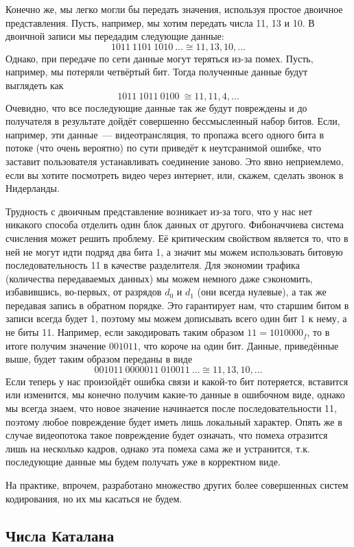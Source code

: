 Конечно же, мы легко могли бы передать значения, используя простое двоичное представления. Пусть, например, мы хотим передать числа 11, 13 и 10. В двоичной записи мы передадим следующие данные:
$$1011\ 1101\ 1010\ \ldots \cong 11,13,10,\ldots$$
Однако, при передаче по сети данные могут теряться из-за помех. Пусть, например, мы потеряли четвёртый бит. Тогда полученные данные будут выглядеть как
$$1011\ 1011\ 0100\ \cong 11, 11, 4, \ldots$$
Очевидно, что все последующие данные так же будут повреждены и до получателя в результате дойдёт совершенно бессмысленный набор битов. Если, например, эти данные~— видеотрансляция, то пропажа всего одного бита в потоке (что очень вероятно) по сути приведёт к неутсранимой ошибке, что заставит пользователя устанавливать соединение заново. Это явно неприемлемо, если вы хотите посмотреть видео через интернет, или, скажем, сделать звонок в Нидерланды.

Трудность с двоичным представление возникает из-за того, что у нас нет никакого способа отделить один блок данных от другого. Фибоначчиева система счисления может решить проблему. Её критическим свойством является то, что в ней не могут идти подряд два бита 1, а значит мы можем использовать битовую последовательность 11 в качестве разделителя. Для экономии трафика (количества передаваемых данных) мы можем немного даже сэкономить, избавившись, во-первых, от разрядов $d_0$ и $d_1$ (они всегда нулевые), а так же передавая запись в обратном порядке. Это гарантирует нам, что старшим битом в записи всегда будет 1, поэтому мы можем дописывать всего один бит 1 к нему, а не биты 11. Например, если закодировать таким образом $11=1010000_f$, то в итоге получим значение $001011$, что короче на один бит. Данные, приведённые выше, будет таким образом переданы в виде
$$001011\ 0000011\ 010011\ \ldots \cong 11, 13, 10, \ldots$$
Если теперь у нас произойдёт ошибка связи и какой-то бит потеряется, вставится или изменится, мы конечно получим какие-то данные в ошибочном виде, однако мы всегда знаем, что новое значение начинается после последовательности 11, поэтому любое повреждение будет иметь лишь локальный характер. Опять же в случае видеопотока такое повреждение будет означать, что помеха отразится лишь на несколько кадров, однако эта помеха сама же и устранится, т.к. последующие данные мы будем получать уже в корректном виде.

На практике, впрочем, разработано множество других более совершенных систем кодирования, но их мы касаться не будем.

\subsection{Числа Каталана}

